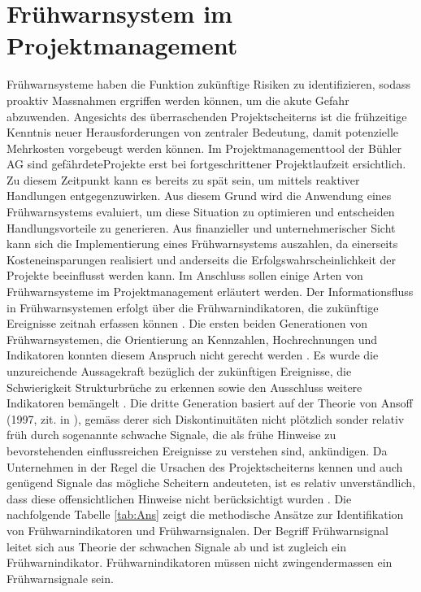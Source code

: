 \section{Frühwarnsystem im Projektmanagement}
Frühwarnsysteme haben die Funktion zukünftige Risiken zu identifizieren, sodass proaktiv Massnahmen ergriffen werden können, um die akute Gefahr abzuwenden. Angesichts des überraschenden Projektscheiterns ist die frühzeitige Kenntnis neuer Herausforderungen von zentraler Bedeutung, damit potenzielle Mehrkosten vorgebeugt werden können. Im Projektmanagementtool der Bühler AG sind \glqq gefährdete\grqq{ }Projekte erst bei fortgeschrittener Projektlaufzeit ersichtlich. Zu diesem Zeitpunkt kann es bereits zu spät sein, um mittels reaktiver Handlungen entgegenzuwirken. Aus diesem Grund wird die Anwendung eines Frühwarnsystems evaluiert, um diese Situation zu optimieren und entscheiden Handlungsvorteile zu generieren. Aus finanzieller und unternehmerischer Sicht kann sich die Implementierung eines Frühwarnsystems auszahlen, da einerseits Kosteneinsparungen realisiert und anderseits die Erfolgswahrscheinlichkeit der Projekte beeinflusst werden kann. Im Anschluss sollen einige Arten von Frühwarnsysteme im Projektmanagement erläutert werden.  
\newline\newline
Der Informationsfluss in Frühwarnsystemen erfolgt über die Frühwarnindikatoren, die zukünftige Ereignisse zeitnah erfassen können \citep[S.~24]{jacrieg12}. Die ersten beiden Generationen von Frühwarnsystemen, die Orientierung an Kennzahlen, Hochrechnungen und Indikatoren konnten diesem Anspruch nicht gerecht werden \citep[S.~25-30]{jacrieg12}. Es wurde die unzureichende Aussagekraft bezüglich der zukünftigen Ereignisse, die Schwierigkeit Strukturbrüche zu erkennen sowie den Ausschluss weitere Indikatoren bemängelt \citep [S.~26-28]{jacrieg12}. Die dritte Generation basiert auf der Theorie von Ansoff (1997, zit. in \citealp{haan13}), gemäss derer sich Diskontinuitäten nicht plötzlich sonder relativ früh durch sogenannte schwache Signale, die als frühe Hinweise zu bevorstehenden einflussreichen Ereignisse zu verstehen sind, ankündigen. Da Unternehmen in der Regel die Ursachen des Projektscheiterns kennen und auch genügend Signale das mögliche Scheitern andeuteten, ist es relativ unverständlich, dass diese offensichtlichen Hinweise nicht berücksichtigt wurden \citep{haan13}. Die nachfolgende Tabelle \ref{tab:Ans} zeigt die methodische Ansätze zur Identifikation von Frühwarnindikatoren und Frühwarnsignalen. Der Begriff Frühwarnsignal leitet sich aus Theorie der schwachen Signale ab und ist zugleich ein Frühwarnindikator. Frühwarnindikatoren müssen nicht zwingendermassen ein Frühwarnsignale sein.
